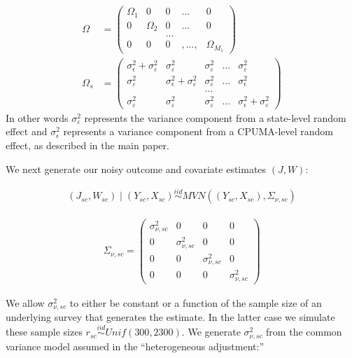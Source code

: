 \begin{align}
    \label{eqn:phecvariance1}\Omega &= \begin{pmatrix}
    \Omega_1 & 0 & 0 & ... & 0 \\
    0 & \Omega_2 & 0 &  ...  & 0 \\
    & & ...  & & \\
    0 & 0 & 0 &, ..., & \Omega_{M_1} 
    \end{pmatrix} \\
    \label{eqn:phecvariance2}\Omega_s &= \begin{pmatrix}
    \sigma^2_{\epsilon} + \sigma^2_{\varepsilon} & \sigma^2_{\varepsilon} & \sigma^2_{\varepsilon} & ... & \sigma^2_{\varepsilon} \\
    \sigma^2_{\varepsilon} & \sigma^2_{\epsilon} + \sigma^2_{\varepsilon} & \sigma^2_{\varepsilon}& ... & \sigma^2_{\epsilon} \\
    & & ... & & \\
    \sigma^2_{\varepsilon} & \sigma^2_{\varepsilon} & \sigma^2_{\varepsilon} & ... & \sigma^2_{\epsilon} + \sigma^2_{\varepsilon}
    \end{pmatrix}
\end{align}
%
In other words $\sigma^2_{\varepsilon}$ represents the variance component from a state-level random effect and $\sigma^2_{\epsilon}$ represents a variance component from a CPUMA-level random effect, as described in the main paper.

We next generate our noisy outcome and covariate estimates $(J, W)$:

\begin{align*}
(J_{sc}, W_{sc}) \mid (Y_{sc}, X_{sc}) \stackrel{iid}\sim MVN((Y_{sc}, X_{sc}), \Sigma_{\nu, sc})
\end{align*}

\begin{align*}
    \Sigma_{\nu, sc} = \begin{pmatrix}
    \sigma^2_{\nu, sc} & 0 & 0 & 0 \\
    0 & \sigma^2_{\nu, sc} & 0 & 0 \\
    0 & 0 & \sigma^2_{\nu, sc} & 0 \\
    0 & 0 & 0 & \sigma^2_{\nu, sc}
    \end{pmatrix}
\end{align*}

We allow $\sigma^2_{\nu, sc}$ to either be constant or a function of the sample size of an underlying survey that generates the estimate. In the latter case we simulate these sample sizes $r_{sc} \stackrel{iid}\sim Unif(300, 2300)$. We generate $\sigma_{\nu, sc}^2$ from the common variance model assumed in the ``heterogeneous adjustment:''

